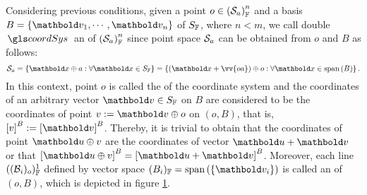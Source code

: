  Considering previous conditions, given a point $o\in\eamsd{S}{F}{a}{n}$ and a basis $B=\{\vto{v}_1,\cdots,\vto{v}_n\}$ of $S_\cam{F}$, where $n<m$, we call double $\gloref{coordSys}$ an  of $\eamsd{S}{F}{a}{n}$ since point space $\epu{S}_a$ can be obtained from $o$ and $B$ as follows:
\begin{equation}\label{eq:pointSpace}
\epu{S}_a=\{\vto{x}\oplus a:\forall \vto{x}\in S_\cam{F}\}= \{(\vto{x}+\vv{oa})\oplus o:\forall \vto{x}\in \spn{(B)}\}\,.
\end{equation}
In this context, point $o$ is called the  of the coordinate system and the coordinates of an arbitrary vector $\vto{v}\in S_\cam{F}$ on $B$ are considered to be the coordinates of point $v:=\vto{v}\oplus o$ on $(o,B)$, that is, $\mav{v}{B}:=\mav{\vto{v}}{B}$. Thereby, it is trivial to obtain that the coordinates of point $\vto{u}\oplus v$ are the coordinates of vector $\vto{u}+\vto{v}$ or that $\mav{\vto{u}\oplus v}{B}=\mav{\vto{u}+\vto{v}}{B}$. Moreover, each line $((\mathcal{B}_i)_o)^1_\cam{F}$ defined by vector space $(B_i)_\cam{F}=\spn{(\{\vto{v}_i\})}$ is called an  of $(o,B)$, which is depicted in figure \ref{fg:coordSystem}.
\begin{figure}[!ht]
	\centering
	\begin{center}
		\scalebox{.72}{}
	\end{center}
	\label{fg:coordSystem}
\end{figure}
